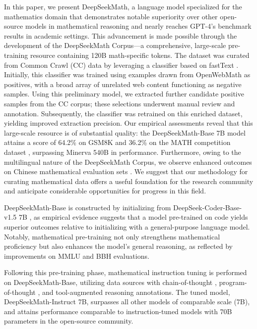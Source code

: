 In this paper, we present DeepSeekMath, a language model specialized for the mathematics domain that demonstrates notable superiority over other open-source models in mathematical reasoning and nearly reaches GPT-4’s benchmark results in academic settings. This advancement is made possible through the development of the DeepSeekMath Corpus—a comprehensive, large-scale pre-training resource containing 120B math-specific tokens. The dataset was curated from Common Crawl (CC) data by leveraging a classifier based on fastText \citep{joulin2016fasttext}. Initially, this classifier was trained using examples drawn from OpenWebMath \citep{openwebmath} as positives, with a broad array of unrelated web content functioning as negative samples. Using this preliminary model, we extracted further candidate positive samples from the CC corpus; these selections underwent manual review and annotation. Subsequently, the classifier was retrained on this enriched dataset, yielding improved extraction precision. Our empirical assessments reveal that this large-scale resource is of substantial quality: the DeepSeekMath-Base 7B model attains a score of 64.2\% on GSM8K \citep{gsm8k} and 36.2\% on the MATH competition dataset \citep{MATH}, surpassing Minerva 540B \citep{minerva} in performance. Furthermore, owing to the multilingual nature of the DeepSeekMath Corpus, we observe enhanced outcomes on Chinese mathematical evaluation sets \citep{wei2023cmath,agieval}. We suggest that our methodology for curating mathematical data offers a useful foundation for the research community and anticipate considerable opportunities for progress in this field.

DeepSeekMath-Base is constructed by initializing from DeepSeek-Coder-Base-v1.5 7B \citep{deepseek-coder}, as empirical evidence suggests that a model pre-trained on code yields superior outcomes relative to initializing with a general-purpose language model. Notably, mathematical pre-training not only strengthens mathematical proficiency but also enhances the model's general reasoning, as reflected by improvements on MMLU \citep{mmlu} and BBH \citep{bbh} evaluations.

Following this pre-training phase, mathematical instruction tuning is performed on DeepSeekMath-Base, utilizing data sources with chain-of-thought \citep{cot}, program-of-thought \citep{pot,pal}, and tool-augmented reasoning \citep{tora} annotations. The tuned model, DeepSeekMath-Instruct 7B, surpasses all other models of comparable scale (7B), and attains performance comparable to instruction-tuned models with 70B parameters in the open-source community.

